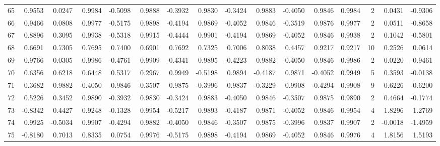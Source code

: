 \begin{tabular}{lrrrrrrrrrrrrrrr}
65  &      0.9553 &  0.0247 &  0.9984 & -0.5098 &  0.9888 & -0.3932 &  0.9830 & -0.3424 &  0.9883 & -0.4050 &   0.9846 &     0.9984 &      2 &                    0.0431 &                    -0.9306 \\
66  &      0.9466 &  0.0808 &  0.9977 & -0.5175 &  0.9898 & -0.4194 &  0.9869 & -0.4052 &  0.9846 & -0.3519 &   0.9876 &     0.9977 &      2 &                    0.0511 &                    -0.8658 \\
67  &      0.8896 &  0.3095 &  0.9938 & -0.5318 &  0.9915 & -0.4444 &  0.9901 & -0.4194 &  0.9869 & -0.4052 &   0.9846 &     0.9938 &      2 &                    0.1042 &                    -0.5801 \\
68  &      0.6691 &  0.7305 &  0.7695 &  0.7400 &  0.6901 &  0.7692 &  0.7325 &  0.7006 &  0.8038 &  0.4457 &   0.9217 &     0.9217 &     10 &                    0.2526 &                     0.0614 \\
69  &      0.9766 &  0.0305 &  0.9986 & -0.4761 &  0.9909 & -0.4341 &  0.9895 & -0.4223 &  0.9882 & -0.4050 &   0.9846 &     0.9986 &      2 &                    0.0220 &                    -0.9461 \\
70  &      0.6356 &  0.6218 &  0.6448 &  0.5317 &  0.2967 &  0.9949 & -0.5198 &  0.9894 & -0.4187 &  0.9871 &  -0.4052 &     0.9949 &      5 &                    0.3593 &                    -0.0138 \\
71  &      0.3682 &  0.9882 & -0.4050 &  0.9846 & -0.3507 &  0.9875 & -0.3996 &  0.9837 & -0.3229 &  0.9908 &  -0.4294 &     0.9908 &      9 &                    0.6226 &                     0.6200 \\
72  &      0.5226 &  0.3452 &  0.9890 & -0.3932 &  0.9830 & -0.3424 &  0.9883 & -0.4050 &  0.9846 & -0.3507 &   0.9875 &     0.9890 &      2 &                    0.4664 &                    -0.1774 \\
73  &     -0.8342 &  0.4427 &  0.9248 & -0.1328 &  0.9954 & -0.5217 &  0.9893 & -0.4187 &  0.9871 & -0.4052 &   0.9846 &     0.9954 &      4 &                    1.8296 &                     1.2769 \\
74  &      0.9925 & -0.5034 &  0.9907 & -0.4294 &  0.9882 & -0.4050 &  0.9846 & -0.3507 &  0.9875 & -0.3996 &   0.9837 &     0.9907 &      2 &                   -0.0018 &                    -1.4959 \\
75  &     -0.8180 &  0.7013 &  0.8335 &  0.0754 &  0.9976 & -0.5175 &  0.9898 & -0.4194 &  0.9869 & -0.4052 &   0.9846 &     0.9976 &      4 &                    1.8156 &                     1.5193 \\

\end{tabular}
